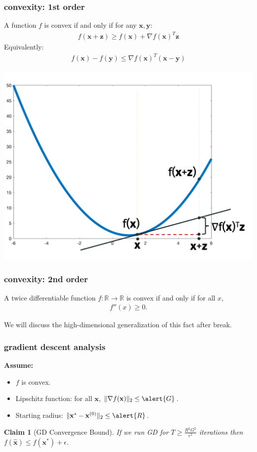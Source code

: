 \documentclass[compress]{beamer}
\newcommand{\bv}[1]{\mathbf{#1}}
\newcommand{\R}{\mathbb{R}}
\newtheorem{claim}[theorem]{Claim}
\begin{document}
\begin{frame}[t]
	\frametitle{convexity: 1st order}	\small
		\begin{definition}
		A function $f$ is convex if and only if for any $\bv{x}, \bv{y}$:
		\begin{align*}
			f(\bv{x} + \bv{z}) \geq f(\bv{x}) + \nabla f(\bv{x})^T\bv{z}
		\end{align*}
	\vspace{-1em}
	Equivalently:
	\vspace{-.5em}
		\begin{align*}
			f(\bv{x}) - f(\bv{y}) \leq \nabla f(\bv{x})^T (\bv{x} - \bv{y})
		\end{align*}
	\vspace{-1em}
	\end{definition}

	\includegraphics[width=.5\textwidth]{convex2.png}

\end{frame}


\begin{frame}[t]
	\frametitle{convexity: 2nd order}	\small
		\begin{definition}
		A twice differentiable function $f: \R\rightarrow \R$ is convex if and only if for all $x$, 
		\begin{align*}
			f''(x) \geq 0.
		\end{align*}
	\vspace{-1em}
	\end{definition}

	We will discuss the high-dimensional generalization of this fact after break.

\end{frame}

\begin{frame}[t]
	\frametitle{gradient descent analysis}
	\textbf{Assume:}
	\begin{itemize}
		\item $f$ is convex.
		\item Lipschitz function: for all $\bv{x}$, $\|\nabla f(\bv{x})\|_2 \leq \alert{G}$.
		\item Starting radius: $\|\bv{x}^{*} - \bv{x}^{(0)}\|_2 \leq \alert{R}$.
	\end{itemize}
	
	\begin{claim}[GD Convergence Bound]
		If we run GD for $T \geq \frac{R^2G^2}{\epsilon^2}$ iterations then $f(\hat{\bv{x}}) \leq f(\bv{x}^*) + \epsilon$.
	\end{claim}
\end{frame}
\end{document}
